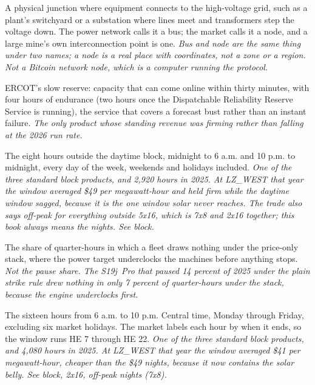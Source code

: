 \begin{description}[leftmargin=0pt,style=unboxed,itemsep=0.35em,parsep=0.15em]
\item[node] \hypertarget{glossary:node}{}A physical junction where equipment connects to the high-voltage grid, such as a plant's switchyard or a substation where lines meet and transformers step the voltage down. The power network calls it a bus; the market calls it a node, and a large mine's own interconnection point is one. \emph{Bus and node are the same thing under two names; a node is a real place with coordinates, not a zone or a region. Not a Bitcoin network node, which is a computer running the protocol.}
\item[Non-Spinning Reserve (Non-Spin)] \hypertarget{glossary:non-spinning-reserve}{}ERCOT's slow reserve: capacity that can come online within thirty minutes, with four hours of endurance (two hours once the Dispatchable Reliability Reserve Service is running), the service that covers a forecast bust rather than an instant failure. \emph{The only product whose standing revenue was firming rather than falling at the 2026 run rate.}
\item[off-peak nights (7x8)] \hypertarget{glossary:off-peak-nights}{}The eight hours outside the daytime block, midnight to 6 a.m. and 10 p.m. to midnight, every day of the week, weekends and holidays included. \emph{One of the three standard block products, and 2,920 hours in 2025. At LZ\_WEST that year the window averaged \$49 per megawatt-hour and held firm while the daytime window sagged, because it is the one window solar never reaches. The trade also says off-peak for everything outside 5x16, which is 7x8 and 2x16 together; this book always means the nights. See block.}
\item[off share] \hypertarget{glossary:off-share}{}The share of quarter-hours in which a fleet draws nothing under the price-only stack, where the power target underclocks the machines before anything stops. \emph{Not the pause share. The S19j~Pro that paused 14 percent of 2025 under the plain strike rule drew nothing in only 7 percent of quarter-hours under the stack, because the engine underclocks first.}
\item[on-peak (5x16)] \hypertarget{glossary:on-peak}{}The sixteen hours from 6 a.m. to 10 p.m. Central time, Monday through Friday, excluding six market holidays. The market labels each hour by when it ends, so the window runs HE 7 through HE 22. \emph{One of the three standard block products, and 4,080 hours in 2025. At LZ\_WEST that year the window averaged \$41 per megawatt-hour, cheaper than the \$49 nights, because it now contains the solar belly. See block, 2x16, off-peak nights (7x8).}

\end{description}
